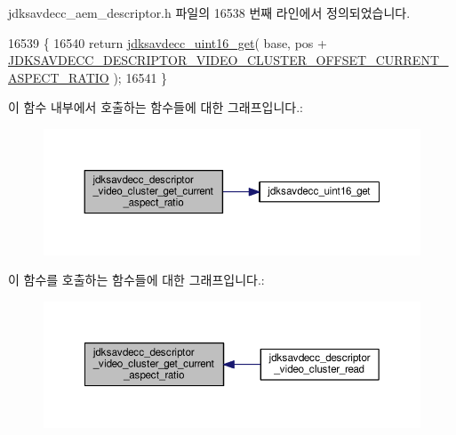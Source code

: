 jdksavdecc\+\_\+aem\+\_\+descriptor.\+h 파일의 16538 번째 라인에서 정의되었습니다.


\begin{DoxyCode}
16539 \{
16540     \textcolor{keywordflow}{return} \hyperlink{group__endian_ga3fbbbc20be954aa61e039872965b0dc9}{jdksavdecc\_uint16\_get}( base, pos + 
      \hyperlink{group__descriptor__video__cluster_gabffef4b51634347e0f912ad6b97ddb6a}{JDKSAVDECC\_DESCRIPTOR\_VIDEO\_CLUSTER\_OFFSET\_CURRENT\_ASPECT\_RATIO}
       );
16541 \}
\end{DoxyCode}


이 함수 내부에서 호출하는 함수들에 대한 그래프입니다.\+:
\nopagebreak
\begin{figure}[H]
\begin{center}
\leavevmode
\includegraphics[width=350pt]{group__descriptor__video__cluster_ga0143cf82227db8f2fdc66a0304c589e1_cgraph}
\end{center}
\end{figure}




이 함수를 호출하는 함수들에 대한 그래프입니다.\+:
\nopagebreak
\begin{figure}[H]
\begin{center}
\leavevmode
\includegraphics[width=350pt]{group__descriptor__video__cluster_ga0143cf82227db8f2fdc66a0304c589e1_icgraph}
\end{center}
\end{figure}



